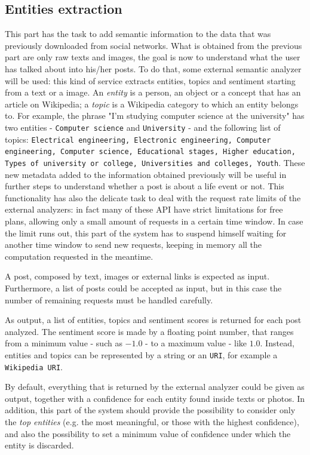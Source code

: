\subsection{Entities extraction}
This part has the task to add semantic information to the data that was previously downloaded from social networks. What is obtained from the previous part are only raw texts and images, the goal is now to understand what the user has talked about into his/her posts. To do that, some external semantic analyzer will be used: this kind of service extracts entities, topics and sentiment starting from a text or a image.
An \textit{entity} is a person, an object or a concept that has an article on Wikipedia; a \textit{topic} is a Wikipedia category to which an entity belongs to. For example, the phrase "I'm studying computer science at the university" has two entities - \texttt{Computer science} and \texttt{University} - and the following list of topics: \texttt{Electrical engineering, Electronic engineering, Computer engineering, Computer science, Educational stages, Higher education, Types of university or college, Universities and colleges, Youth}. These new metadata added to the information obtained previously will be useful in further steps to understand whether a post is about a life event or not. This functionality has also the delicate task to deal with the request rate limits of the external analyzers: in fact many of these API have strict limitations for free plans, allowing only a small amount of requests in a certain time window. In case the limit runs out, this part of the system has to suspend himself waiting for another time window to send new requests, keeping in memory all the computation requested in the meantime.

A post, composed by text, images or external links is expected as input. Furthermore, a list of posts could be accepted as input, but in this case the number of remaining requests must be handled carefully.

As output, a list of entities, topics and sentiment scores is returned for each post analyzed. The sentiment score is made by a floating point number, that ranges from a minimum value - such as $ -1.0 $ - to a maximum value - like $ 1.0 $. Instead, entities and topics can be represented by a string or an \texttt{URI}, for example a \texttt{Wikipedia URI}.

By default, everything that is returned by the external analyzer could be given as output, together with a confidence for each entity found inside texts or photos. In addition, this part of the system should provide the possibility to consider only the \textit{top entities} (e.g. the most meaningful, or those with the highest confidence), and also the possibility to set a minimum value of confidence under which the entity is discarded.

